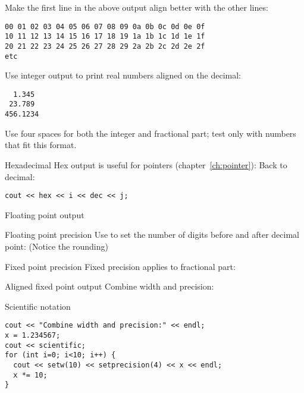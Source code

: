 \begin{exercise}
  \label{ex:leadzero}
  Make the first line in the above output align better with the other lines:
\begin{verbatim}
00 01 02 03 04 05 06 07 08 09 0a 0b 0c 0d 0e 0f 
10 11 12 13 14 15 16 17 18 19 1a 1b 1c 1d 1e 1f 
20 21 22 23 24 25 26 27 28 29 2a 2b 2c 2d 2e 2f 
etc
\end{verbatim}
\end{exercise}

\begin{exercise}
  \label{ex:fixedpout}
  Use integer output to print real numbers aligned on the
  decimal:
\begin{verbatim}
  1.345
 23.789
456.1234
\end{verbatim}
  Use four spaces for both the integer and fractional part; test only
  with numbers that fit this format.
\end{exercise}

\begin{block}{Hexadecimal}
  \label{sl:io-hex}
  Hex output is useful for pointers (chapter~\ref{ch:pointer}):
  Back to decimal:
\begin{lstlisting}
cout << hex << i << dec << j;
\end{lstlisting}
\end{block}

 {Floating point output}

\begin{block}{Floating point precision}
  \label{sl:io-float}
  Use  to set the number of digits before and after
  decimal point:
  (Notice the rounding)
\end{block}

\begin{block}{Fixed point precision}
  \label{sl:io-fix}
  Fixed precision applies to fractional part:
\end{block}

\begin{block}{Aligned fixed point output}
  \label{sl:io-align}
  Combine width and precision:
\end{block}

\begin{block}{Scientific notation}
  \label{sl:io-sci}
\begin{verbatim}
cout << "Combine width and precision:" << endl;
x = 1.234567;
cout << scientific;
for (int i=0; i<10; i++) {
  cout << setw(10) << setprecision(4) << x << endl;
  x *= 10;
}
\end{verbatim}
\end{block}


